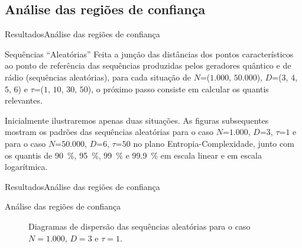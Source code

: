 \documentclass[10pt,xcolor={dvipsnames}]{beamer}
\begin{document}
\subsection{Análise das regiões de confiança}
\begin{frame}{Resultados}{Análise das regiões de confiança}
\begin{block}{Sequências ``Aleatórias''}
	Feita a junção das distâncias dos pontos característicos ao ponto de referência das sequências produzidas pelos geradores quântico e de rádio (sequências aleatórias), 
	para cada situação de $N$=($1.000$, $50.000$), $D$=($3$, $4$, $5$, $6$) e $\tau$=($1$, $10$, $30$, $50$), o próximo passo consiste em calcular os quantis relevantes.
	
	\pause
	Inicialmente ilustraremos apenas duas situações.
	As figuras subsequentes mostram os padrões das sequências aleatórias para o caso $N$=$1.000$, $D$=$3$, $\tau$=$1$ e para o caso $N$=$50.000$, $D$=$6$, $\tau$=$50$ no plano Entropia-Complexidade, junto com os quantis de \SI{90}{\percent}, \SI{95}{\percent}, \SI{99}{\percent} e \SI{99,9}{\percent} em escala linear e em escala logarítmica.
\end{block}
\end{frame}

\begin{frame}{Resultados}{Análise das regiões de confiança}
\begin{block}{Análise das regiões de confiança}
	\begin{figure}
		\centering
		\caption{Diagramas de dispersão das sequências aleatórias para o caso $N=1.000$, $D=3$ e $\tau=1$.}\label{Fig:AleattD3tau1}
	\end{figure}	
\end{block}
\end{frame}
\end{document}

